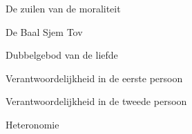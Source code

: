 \documentclass[main.tex]{subfiles}
\begin{document}
\begin{examenvraag}
    \begin{vraag}
        De zuilen van de moraliteit
    \end{vraag}

    \begin{antwoord}

    \end{antwoord}
\end{examenvraag}


\begin{examenvraag}
    \begin{vraag}
        De Baal Sjem Tov
    \end{vraag}

    \begin{antwoord}

    \end{antwoord}
\end{examenvraag}


\begin{examenvraag}
    \begin{vraag}
        Dubbelgebod van de liefde
    \end{vraag}

    \begin{antwoord}

    \end{antwoord}
\end{examenvraag}


\begin{examenvraag}
    \begin{vraag}
        Verantwoordelijkheid in de eerste persoon
    \end{vraag}

    \begin{antwoord}

    \end{antwoord}
\end{examenvraag}


\begin{examenvraag}
    \begin{vraag}
        Verantwoordelijkheid in de tweede persoon
    \end{vraag}

    \begin{antwoord}

    \end{antwoord}
\end{examenvraag}


\begin{examenvraag}
    \begin{vraag}
        Heteronomie
    \end{vraag}

    \begin{antwoord}

    \end{antwoord}
\end{examenvraag}
\end{document}
